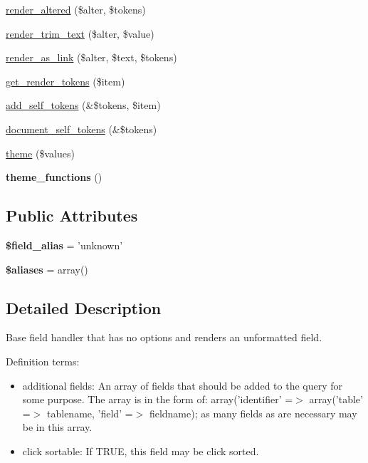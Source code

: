 \begin{CompactItemize}
\hyperlink{classviews__handler__field_afbf9e117418a38b937ba670126215a4}{render\_\-altered} (\$alter, \$tokens)
\item 
\hyperlink{classviews__handler__field_a2c5f49595a97848d523338a5c64a7c6}{render\_\-trim\_\-text} (\$alter, \$value)
\item 
\hyperlink{classviews__handler__field_44eafd927c2a6d93af234f69e8560078}{render\_\-as\_\-link} (\$alter, \$text, \$tokens)
\item 
\hyperlink{classviews__handler__field_09c76b4e29ba8b0e6694ba4e341ef609}{get\_\-render\_\-tokens} (\$item)
\item 
\hyperlink{classviews__handler__field_c61cc83a4c8c579993a254b5b1e16cbc}{add\_\-self\_\-tokens} (\&\$tokens, \$item)
\item 
\hyperlink{classviews__handler__field_e33446d1059f13fbfb06a37da04d320e}{document\_\-self\_\-tokens} (\&\$tokens)
\item 
\hyperlink{classviews__handler__field_31b777437d94e4904c546e3bb0d76c16}{theme} (\$values)
\item 
\hypertarget{classviews__handler__field_fd9437e7af9535ed5301dc48f619f24a}{
\textbf{theme\_\-functions} ()}
\label{classviews__handler__field_fd9437e7af9535ed5301dc48f619f24a}

\end{CompactItemize}
\subsection*{Public Attributes}
\begin{CompactItemize}
\item 
\hypertarget{classviews__handler__field_4b54482d14d20926ed1a5b43c3cdc4d4}{
\textbf{\$field\_\-alias} = 'unknown'}
\label{classviews__handler__field_4b54482d14d20926ed1a5b43c3cdc4d4}

\item 
\hypertarget{classviews__handler__field_1de93e099b1d18c873f0ad2110ff24d3}{
\textbf{\$aliases} = array()}
\label{classviews__handler__field_1de93e099b1d18c873f0ad2110ff24d3}

\end{CompactItemize}


\subsection{Detailed Description}
Base field handler that has no options and renders an unformatted field.

Definition terms:\begin{itemize}
\item additional fields: An array of fields that should be added to the query for some purpose. The array is in the form of: array('identifier' =$>$ array('table' =$>$ tablename, 'field' =$>$ fieldname); as many fields as are necessary may be in this array.\item click sortable: If TRUE, this field may be click sorted. \end{itemize}


